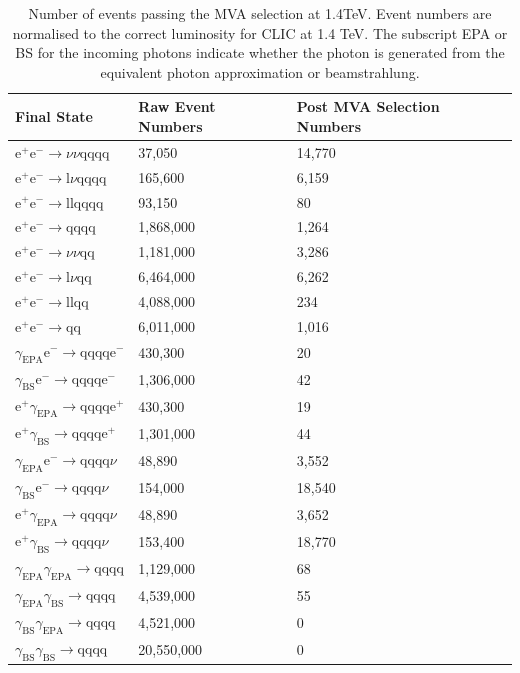 \begin{table}[h!]
\centering
\begin{tabular}{ l l l}
\hline
Final State & Raw Event Numbers & Post MVA Selection Numbers \\ 
\hline
$\text{e}^{+}\text{e}^{-} \rightarrow \nu{\nu}\text{qqqq}$ & 37,050 & 14,770 \\
$\text{e}^{+}\text{e}^{-} \rightarrow \text{l}\nu\text{qqqq}$ & 165,600 & 6,159 \\
$\text{e}^{+}\text{e}^{-} \rightarrow \text{llqqqq}$ & 93,150 & 80 \\
$\text{e}^{+}\text{e}^{-} \rightarrow \text{qqqq}$ & 1,868,000 & 1,264 \\
$\text{e}^{+}\text{e}^{-} \rightarrow \nu{\nu}\text{qq}$ & 1,181,000 & 3,286 \\
$\text{e}^{+}\text{e}^{-} \rightarrow \text{l}\nu\text{qq}$ & 6,464,000 & 6,262 \\
$\text{e}^{+}\text{e}^{-} \rightarrow \text{llqq}$ & 4,088,000 & 234 \\
$\text{e}^{+}\text{e}^{-} \rightarrow \text{qq}$ & 6,011,000 & 1,016 \\
$\gamma_{\text{EPA}}\text{e}^{-} \rightarrow \text{qqqq}\text{e}^{-}$ & 430,300 & 20 \\
$\gamma_{\text{BS}}\text{e}^{-} \rightarrow \text{qqqq}\text{e}^{-}$ & 1,306,000 & 42 \\
$\text{e}^{+}\gamma_{\text{EPA}} \rightarrow \text{qqqq}\text{e}^{+}$ & 430,300 & 19 \\
$\text{e}^{+}\gamma_{\text{BS}} \rightarrow \text{qqqq}\text{e}^{+}$ & 1,301,000 & 44 \\
$\gamma_{\text{EPA}}\text{e}^{-} \rightarrow \text{qqqq}\nu$ & 48,890 & 3,552 \\
$\gamma_{\text{BS}}\text{e}^{-} \rightarrow \text{qqqq}\nu$ & 154,000 & 18,540 \\
$\text{e}^{+}\gamma_{\text{EPA}} \rightarrow \text{qqqq}\nu$ & 48,890 & 3,652 \\
$\text{e}^{+}\gamma_{\text{BS}} \rightarrow \text{qqqq}\nu$ & 153,400 & 18,770 \\
$\gamma_{\text{EPA}}\gamma_{\text{EPA}} \rightarrow \text{qqqq}$ & 1,129,000 & 68 \\
$\gamma_{\text{EPA}}\gamma_{\text{BS}} \rightarrow \text{qqqq}$ & 4,539,000 & 55 \\
$\gamma_{\text{BS}}\gamma_{\text{EPA}} \rightarrow \text{qqqq}$ & 4,521,000 & 0 \\
$\gamma_{\text{BS}}\gamma_{\text{BS}} \rightarrow \text{qqqq}$ & 20,550,000 & 0 \\
\hline
\end{tabular}
\caption[Number of events passing the MVA selection at 1.4TeV.]{Number of events passing the MVA selection at 1.4TeV.  Event numbers are normalised to the correct luminosity for CLIC at 1.4 TeV.   The subscript EPA or BS for the incoming photons indicate whether the photon is generated from the equivalent photon approximation or beamstrahlung.}
\label{table:postmvanumbers1400GeV}
\end{table}

